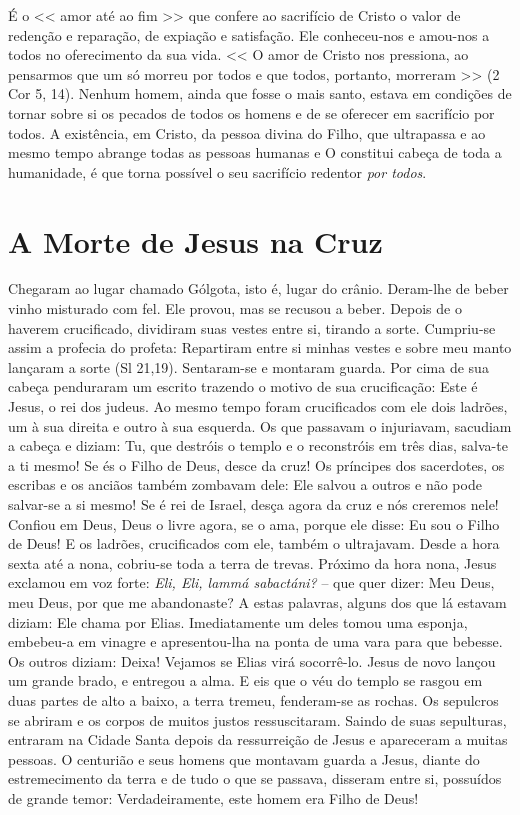 \documentclass{rosario}
\begin{document}

É o << amor até ao fim >> que confere ao sacrifício de Cristo o valor de redenção e reparação, de expiação e satisfação.
Ele conheceu-nos e amou-nos a todos no oferecimento da sua vida.
<< O amor de Cristo nos pressiona, ao pensarmos que um só morreu por todos e que todos, portanto, morreram >> (2 Cor 5, 14).
Nenhum homem, ainda que fosse o mais santo, estava em condições de tornar sobre si os pecados de todos os homens e de se oferecer em sacrifício por todos.
A existência, em Cristo, da pessoa divina do Filho, que ultrapassa e ao mesmo tempo abrange todas as pessoas humanas e O constitui cabeça de toda a humanidade, é que torna possível o seu sacrifício redentor \emph{por todos}.


\section{A Morte de Jesus na Cruz}


Chegaram ao lugar chamado Gólgota, isto é, lugar do crânio.
Deram-lhe de beber vinho misturado com fel. Ele provou, mas se recusou a beber.
Depois de o haverem crucificado, dividiram suas vestes entre si, tirando a sorte. Cumpriu-se assim a profecia do profeta: Repartiram entre si minhas vestes e sobre meu manto lançaram a sorte (Sl 21,19).
Sentaram-se e montaram guarda.
Por cima de sua cabeça penduraram um escrito trazendo o motivo de sua crucificação:
Este é Jesus, o rei dos judeus.
Ao mesmo tempo foram crucificados com ele dois ladrões, um à sua direita e outro à sua esquerda.
Os que passavam o injuriavam, sacudiam a cabeça e diziam:
Tu, que destróis o templo e o reconstróis em três dias, salva-te a ti mesmo!
Se és o Filho de Deus, desce da cruz!
Os príncipes dos sacerdotes, os escribas e os anciãos também zombavam dele:
Ele salvou a outros e não pode salvar-se a si mesmo!
Se é rei de Israel, desça agora da cruz e nós creremos nele!
Confiou em Deus, Deus o livre agora, se o ama, porque ele disse: Eu sou o Filho de Deus!
E os ladrões, crucificados com ele, também o ultrajavam.
Desde a hora sexta até a nona, cobriu-se toda a terra de trevas.
Próximo da hora nona, Jesus exclamou em voz forte:
\emph{Eli, Eli, lammá sabactáni?} -- que quer dizer: Meu Deus, meu Deus, por que me abandonaste?
A estas palavras, alguns dos que lá estavam diziam: Ele chama por Elias.
Imediatamente um deles tomou uma esponja, embebeu-a em vinagre e apresentou-lha na ponta de uma vara para que bebesse.
Os outros diziam: Deixa! Vejamos se Elias virá socorrê-lo.
Jesus de novo lançou um grande brado, e entregou a alma.
E eis que o véu do templo se rasgou em duas partes de alto a baixo, a terra tremeu, fenderam-se as rochas.
Os sepulcros se abriram e os corpos de muitos justos ressuscitaram.
Saindo de suas sepulturas, entraram na Cidade Santa depois da ressurreição de Jesus e apareceram a muitas pessoas.
O centurião e seus homens que montavam guarda a Jesus, diante do estremecimento da terra e de tudo o que se passava, disseram entre si, possuídos de grande temor:
Verdadeiramente, este homem era Filho de Deus!
\end{document}
